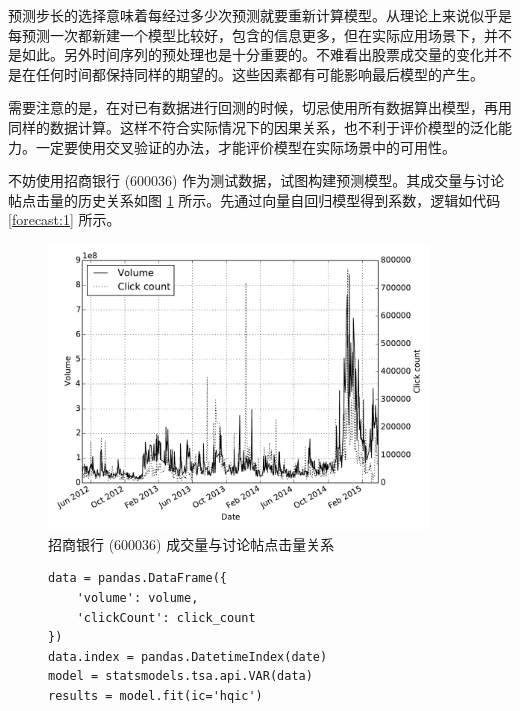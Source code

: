 预测步长的选择意味着每经过多少次预测就要重新计算模型。从理论上来说似乎是每预测一次都新建一个模型比较好，包含的信息更多，但在实际应用场景下，并不是如此。另外时间序列的预处理也是十分重要的。不难看出股票成交量的变化并不是在任何时间都保持同样的期望的。这些因素都有可能影响最后模型的产生。

需要注意的是，在对已有数据进行回测的时候，切忌使用所有数据算出模型，再用同样的数据计算。这样不符合实际情况下的因果关系，也不利于评价模型的泛化能力。一定要使用交叉验证的办法，才能评价模型在实际场景中的可用性。

不妨使用招商银行 (600036) 作为测试数据，试图构建预测模型。其成交量与讨论帖点击量的历史关系如图 \ref{forecast:0} 所示。先通过向量自回归模型得到系数，逻辑如代码 \ref{forecast:1} 所示。

\begin{figure}
  \centering
  \includegraphics[width=0.9\textwidth]{plots/var_forecast_history_line.pdf}
  \caption{招商银行 (600036) 成交量与讨论帖点击量关系}
  \label{forecast:0}
\end{figure}

\begin{figure}
  \begin{minipage}{\textwidth}
    \begin{lstlisting}[caption=向量自回归模型系数计算, label=forecast:1]
data = pandas.DataFrame({
    'volume': volume,
    'clickCount': click_count
})
data.index = pandas.DatetimeIndex(date)
model = statsmodels.tsa.api.VAR(data)
results = model.fit(ic='hqic')
    \end{lstlisting}
  \end{minipage}
\end{figure}

